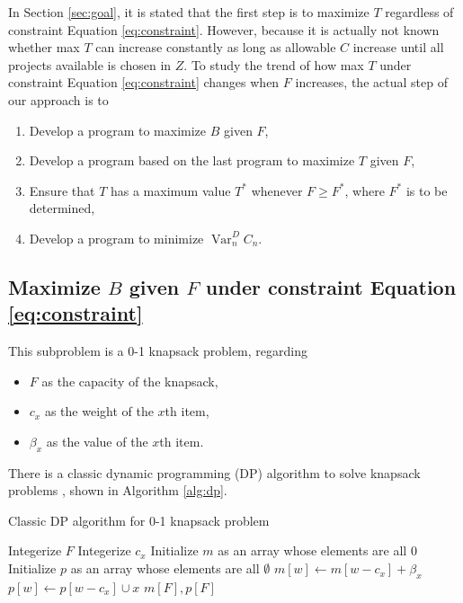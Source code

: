 \documentclass{article}
\DeclareMathOperator*{\var}{Var}
\begin{document}
In Section \ref{sec:goal}, it is stated that the first step is to maximize $T$ regardless of constraint Equation \ref{eq:constraint}.
However, because it is actually not known whether max $T$ can increase constantly as long as allowable $C$ increase until all projects available is chosen in $Z$.
To study the trend of how max $T$ under constraint Equation \ref{eq:constraint} changes when $F$ increases, the actual step of our approach is to
\begin{enumerate}
\item Develop a program to maximize $B$ given $F$,
\item Develop a program based on the last program to maximize $T$ given $F$,
\item Ensure that $T$ has a maximum value $T^*$ whenever $F\ge F^*$, where $F^*$ is to be determined,
\item Develop a program to minimize $\var_n^DC_n$.
\end{enumerate}

\subsection{Maximize $B$ given $F$ under constraint Equation \ref{eq:constraint}}

This subproblem is a 0-1 knapsack problem, regarding
\begin{itemize}
\item $F$ as the capacity of the knapsack,
\item $c_x$ as the weight of the $x$th item,
\item $\beta_x$ as the value of the $x$th item.
\end{itemize}

There is a classic dynamic programming (DP) algorithm to solve knapsack problems \cite{dpknapsack},
shown in Algorithm \ref{alg:dp}.

\begin{algorithm}[h!]
\caption{Classic DP algorithm for 0-1 knapsack problem}
\label{alg:dp}
\begin{algorithmic}
\State Integerize $F$
	\State Integerize $c_x$
\EndFor
{}
\State Initialize $m$ as an array whose elements are all $0$
\State Initialize $p$ as an array whose elements are all $\emptyset$
			\State$m\left[w\right]\leftarrow m\left[w-c_x\right]+\beta_x$
			\State$p\left[w\right]\leftarrow p\left[w-c_x\right]\cup x$
		\EndIf
	\EndFor
\EndFor
\State\Return$m\left[F\right],p\left[F\right]$
\EndFunction
\end{algorithmic}
\end{algorithm}
\end{document}
